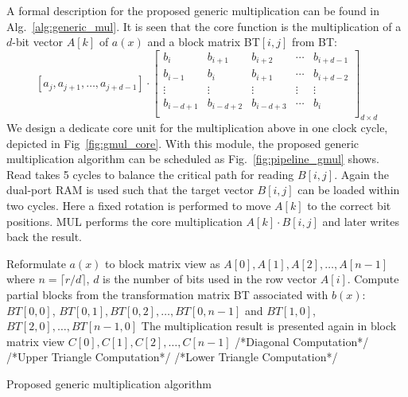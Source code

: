 \documentclass[runningheads]{llncs}
\begin{document}
A formal description for the proposed generic multiplication can be found in Alg.~\ref{alg:generic_mul}. It is seen that the core function is the multiplication of a $d$-bit vector $A[k]$ of $a(x)$ and a block matrix BT$[i,j]$ from BT:
\[
    [a_j,a_{j+1},\ldots,a_{j+d-1}]\cdot
\left[ \begin{array}{ccccc}
b_{i}&b_{i+1}&b_{i+2}&\cdots &b_{i+d-1} \\
b_{i-1}&b_{i}&b_{i+1}&\cdots &b_{i+d-2} \\
\vdots&\vdots&\vdots&\vdots&\vdots\\
b_{i-d+1}&b_{i-d+2}&b_{i-d+3}&\cdots &b_{i} \\
\end{array}
\right ]_{d\times d}
\]
We design a dedicate core unit for the multiplication above in one clock cycle, depicted in Fig~\ref{fig:gmul_core}. With this module, the proposed generic multiplication algorithm can be scheduled as Fig.~\ref{fig:pipeline_gmul} shows. Read takes 5 cycles to balance the critical path for reading $B[i,j]$. Again the dual-port RAM is used such that the target vector $B[i,j]$ can be loaded within two cycles. Here a fixed rotation is performed to move $A[k]$ to the correct bit positions. MUL performs the core multiplication $A[k]\cdot B[i,j]$ and later writes back the result.

\begin{algorithm}[!tbh]
 \DontPrintSemicolon %
    Reformulate $a(x)$ to block matrix view as $A[0],A[1],A[2],\ldots, A[n-1]$ where $n=\lceil r/d \rceil$, $d$ is the number of bits used in the row vector $A[i]$.\;
    Compute partial blocks from the transformation matrix BT associated with $b(x)$: $BT[0,0]$, $BT[0,1],BT[0,2],\ldots,BT[0,n-1]$ and $BT[1,0]$, $BT[2,0],\ldots,BT[n-1,0]$\;
    The multiplication result is presented again in block matrix view $C[0],C[1],C[2],\ldots, C[n-1]$\;
    /*Diagonal Computation*/\;
    /*Upper Triangle Computation*/\;
    /*Lower Triangle Computation*/\;
 \caption{Proposed generic multiplication algorithm}\label{alg:generic_mul}
\end{algorithm}
\end{document}
